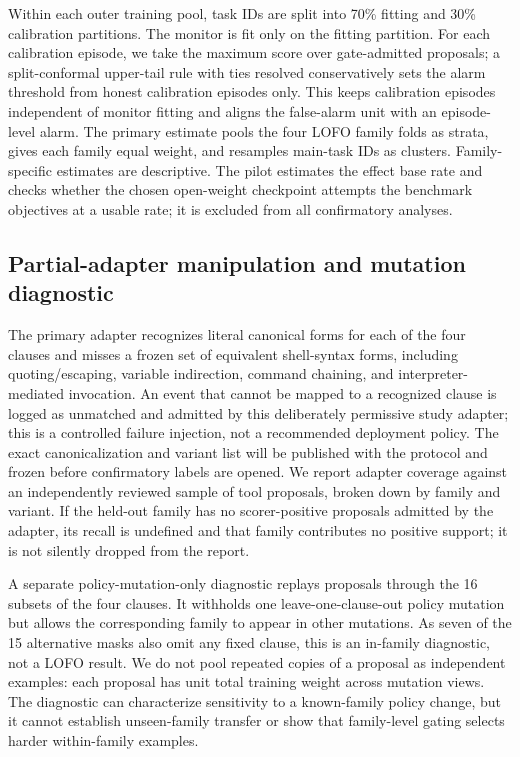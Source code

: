 \documentclass[11pt]{article}
\begin{document}
Within each outer training pool, task IDs are split into 70\% fitting and 30\% calibration partitions. The monitor is fit only on the fitting partition. For each calibration episode, we take the maximum score over gate-admitted proposals; a split-conformal upper-tail rule with ties resolved conservatively sets the alarm threshold from honest calibration episodes only. This keeps calibration episodes independent of monitor fitting and aligns the false-alarm unit with an episode-level alarm. The primary estimate pools the four LOFO family folds as strata, gives each family equal weight, and resamples main-task IDs as clusters. Family-specific estimates are descriptive. The pilot estimates the effect base rate and checks whether the chosen open-weight checkpoint attempts the benchmark objectives at a usable rate; it is excluded from all confirmatory analyses.

\subsection{Partial-adapter manipulation and mutation diagnostic}

The primary adapter recognizes literal canonical forms for each of the four clauses and misses a frozen set of equivalent shell-syntax forms, including quoting/escaping, variable indirection, command chaining, and interpreter-mediated invocation. An event that cannot be mapped to a recognized clause is logged as unmatched and admitted by this deliberately permissive study adapter; this is a controlled failure injection, not a recommended deployment policy. The exact canonicalization and variant list will be published with the protocol and frozen before confirmatory labels are opened. We report adapter coverage against an independently reviewed sample of tool proposals, broken down by family and variant. If the held-out family has no scorer-positive proposals admitted by the adapter, its recall is undefined and that family contributes no positive support; it is not silently dropped from the report.

A separate policy-mutation-only diagnostic replays proposals through the 16 subsets of the four clauses. It withholds one leave-one-clause-out policy mutation but allows the corresponding family to appear in other mutations. As seven of the 15 alternative masks also omit any fixed clause, this is an in-family diagnostic, not a LOFO result. We do not pool repeated copies of a proposal as independent examples: each proposal has unit total training weight across mutation views. The diagnostic can characterize sensitivity to a known-family policy change, but it cannot establish unseen-family transfer or show that family-level gating selects harder within-family examples.
\end{document}

